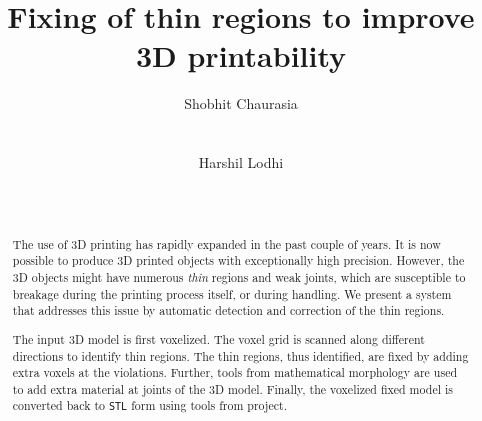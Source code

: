 \documentclass{acm_proc_article-sp}
\begin{document}
\title{Fixing of thin regions to improve 3D printability}
\author{
\alignauthor
Shobhit Chaurasia\\
       \\
       \\
\alignauthor
Harshil Lodhi\\
       \\
       \\
}

\maketitle
\begin{abstract}
The use of 3D printing has rapidly expanded in the past couple of years. It is now possible to produce 3D printed objects with exceptionally high precision. However, the 3D objects might have numerous \textit{thin} regions and weak joints, which are susceptible to breakage during the printing process itself, or during handling. We present a system that addresses this issue by automatic detection and correction of the thin regions.

The input 3D model is first voxelized. The voxel grid is scanned along different directions to identify thin regions. The thin regions, thus identified, are fixed by adding extra voxels at the violations. Further, tools from mathematical morphology are used to add extra material at joints of the 3D model. Finally, the voxelized fixed model is converted back to \texttt{STL} form using tools from \cite{abfab3d:project} project.
\end{abstract}





\end{document}
